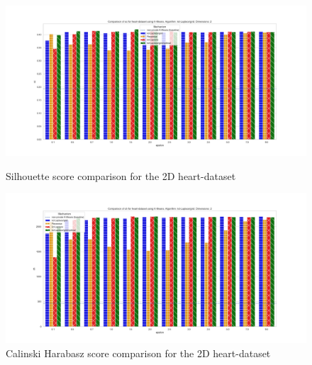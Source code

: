 \begin{figure}[H]
    \centering
    \begin{minipage}[c]{0.8\textwidth}
        \includegraphics[width=1\textwidth]{Results/RQ1/heart-dataset/sc_heart-dataset_comparison.png}
        \caption{Silhouette score comparison for the 2D heart-dataset}
        \label{fig:appendix-sc_heart-dataset_comparison_2d}
    \end{minipage}
    \begin{minipage}[c]{0.8\textwidth}
        \includegraphics[width=1\textwidth]{Results/RQ1/heart-dataset/ch_heart-dataset_comparison.png}
        \caption{Calinski Harabasz score comparison for the 2D heart-dataset}
        \label{fig:appendix-ch_heart-dataset_comparison_2d}
    \end{minipage}

\end{figure}
